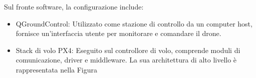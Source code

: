 Sul fronte software, la configurazione include:
\begin{itemize}
    \item QGroundControl: Utilizzato come stazione di controllo da un computer host, fornisce un'interfaccia utente per monitorare e comandare il drone.
    \item Stack di volo PX4: Eseguito sul controllore di volo, comprende moduli di comunicazione, driver e middleware. La sua architettura di alto livello è rappresentata nella Figura 
\end{itemize}

